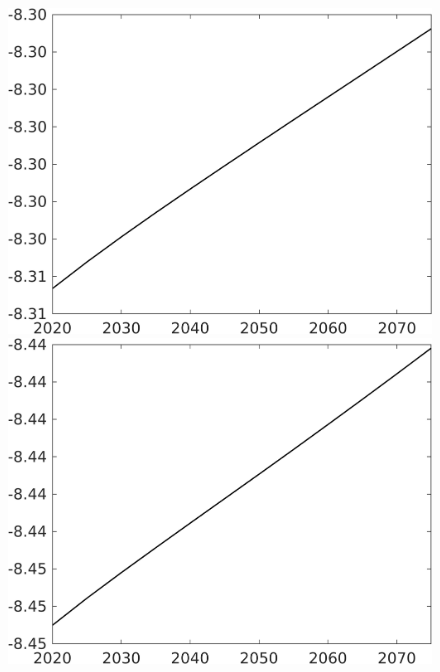 \documentclass[12pt]{article}
\begin{document}
\begin{figure}[h!!]
\begin{minipage}[]{0.32\textwidth}
	\end{minipage}	
	\begin{minipage}[]{0.32\textwidth}
		\includegraphics[width=1\textwidth]{../../codding_model/own_basedOnFried/optimalPol_010922_revision/figures/all_13Sept22/CompTaul_LFBAUPer_Reg0_F_spillover0_nsk0_xgr0_knspil0_sep1_countec0_GovRev0_etaa0.79.png}
	\end{minipage}	
	\begin{minipage}[]{0.32\textwidth}
		\includegraphics[width=1\textwidth]{../../codding_model/own_basedOnFried/optimalPol_010922_revision/figures/all_13Sept22/CompTaul_LFBAUPer_Reg0_G_spillover0_nsk0_xgr0_knspil0_sep1_countec0_GovRev0_etaa0.79.png}

\end{minipage}
\end{figure}
\end{document}
